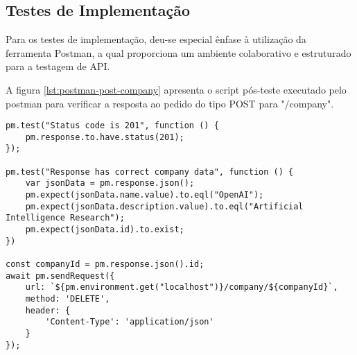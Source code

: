 \subsection{Testes de Implementação}

Para os testes de implementação, deu-se especial ênfase à utilização da ferramenta Postman, a qual proporciona um ambiente colaborativo e estruturado para a testagem de \gls{API}.

A figura \ref{lst:postman-post-company} apresenta o script pós-teste executado pelo postman para verificar a resposta ao pedido do tipo POST para "/company". 

\begin{lstlisting}[style=Javascript, label={lst:postman-post-company}, caption={Script de test da rota POST /company}]
pm.test("Status code is 201", function () {
    pm.response.to.have.status(201);
});

pm.test("Response has correct company data", function () {
    var jsonData = pm.response.json();
    pm.expect(jsonData.name.value).to.eql("OpenAI");
    pm.expect(jsonData.description.value).to.eql("Artificial Intelligence Research");
    pm.expect(jsonData.id).to.exist;
})

const companyId = pm.response.json().id;
await pm.sendRequest({
    url: `${pm.environment.get("localhost")}/company/${companyId}`,
    method: 'DELETE',
    header: {
        'Content-Type': 'application/json'
    }
});
\end{lstlisting}

